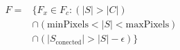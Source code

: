 \documentclass[UTF8]{article}
\begin{document}
\begin{begin}
\end{begin}\begin{equation}
    \begin{aligned}
    F ={} & \{F_{x} \in  F_{c} : (|S| > |C|) \\
          & \cap (\mathrm{minPixels}  < |S| < \mathrm{maxPixels}) \\
          & \cap (|S_{\mathrm{conected}}| > |S| - \epsilon)\}
    \end{aligned}
    \end{equation}
\end{document}
